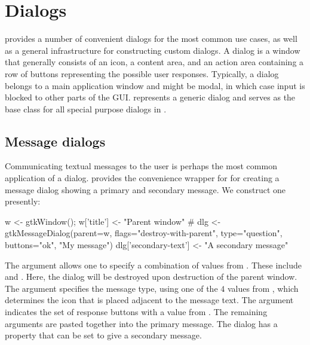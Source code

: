 \section{Dialogs}
\label{sec:dialogs}

\GTK\/ provides a number of convenient dialogs for the most common use
cases, as well as a general infrastructure for constructing custom
dialogs.  A dialog is a window that generally consists of an icon, a
content area, and an action area containing a row of buttons
representing the possible user responses.  Typically, a dialog belongs
to a main application window and might be modal, in which case input
is blocked to other parts of the GUI.  
represents a generic dialog and serves as the base class for all
special purpose dialogs in \GTK.


\subsection{Message dialogs}
\label{sec:gtk-dialog-message}

Communicating textual messages to the user is perhaps the most common
application of a dialog. \GTK\/ provides the
 convenience wrapper for
 for creating a message dialog showing a primary and
secondary message.  We construct one presently:
\begin{Schunk}
\begin{Sinput}
 w <- gtkWindow(); w['title'] <- "Parent window"
 #
 dlg <- gtkMessageDialog(parent=w, 
                         flags="destroy-with-parent",
                         type="question", 
                         buttons="ok",
                         "My message")
 dlg['secondary-text'] <- "A secondary message"
\end{Sinput}
\end{Schunk}
%

The  argument allows one to specify
a combination of values from . These include
 and . Here, the dialog will be
destroyed upon destruction of the parent window. The
 argument specifies the message type,
using one of the $4$ values from , which
determines the icon that is placed adjacent to the message text. The
 argument indicates the set of
response buttons with a value from . The
remaining arguments are pasted together into the primary message.  The
dialog has a  property that can be set to give a
secondary message.

